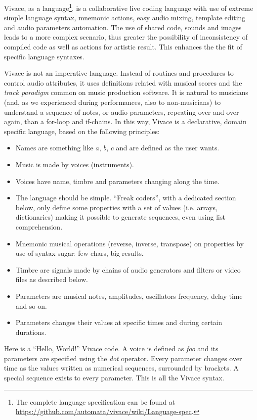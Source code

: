 \documentclass[letterpaper, 12pt]{article}
\begin{document}
Vivace, as a language\footnote{The complete language specification can
  be found at
  \url{https://github.com/automata/vivace/wiki/Language-spec}.}, is a
collaborative live coding language with use of extreme simple language
syntax, mnemonic actions, easy audio mixing, template editing and
audio parameters automation. The use of shared code, sounds and images
leads to a more complex scenario, thus greater the possibility of
inconsistency of compiled code as well as actions for artistic
result. This enhances the the fit of specific language syntaxes.

Vivace is not an imperative language. Instead of routines and
procedures to control audio attributes, it uses definitions related
with musical scores and the \emph{track paradigm} common on music
production software. It is natural to musicians (and, as we
experienced during performances, also to non-musicians) to understand
a sequence of notes, or audio parameters, repeating over and over
again, than a for-loop and if-chains. In this way, Vivace is a
declarative, domain specific language, based on the following
principles:

\begin{itemize}
  
\item Names are something like $a$, $b$, $c$ and are defined as the
  user wants.
\item Music is made by voices (instruments).
\item Voices have name, timbre and parameters changing along the time.
\item The language should be simple. ``Freak coders'', with a
  dedicated section below, only define some properties with a set of
  values (i.e. arrays, dictionaries) making it possible to generate
  sequences, even using list comprehension.
\item Mnemonic musical operations (reverse, inverse, transpose) on
  properties by use of syntax sugar: few chars, big results.
\item Timbre are signals made by chains of audio generators and
  filters or video files as described below.
\item Parameters are musical notes, amplitudes, oscillators frequency,
  delay time and so on.
\item Parameters changes their values at specific times and during
  certain durations.

\end{itemize}

Here is a ``Hello, World!'' Vivace code. A voice is defined as
\textit{foo} and its parameters are specified using the \textit{dot}
operator. Every parameter changes over time as the values written as
numerical sequences, surrounded by brackets. A special sequence exists
to every parameter.  This is all the Vivace syntax.
\end{document}
